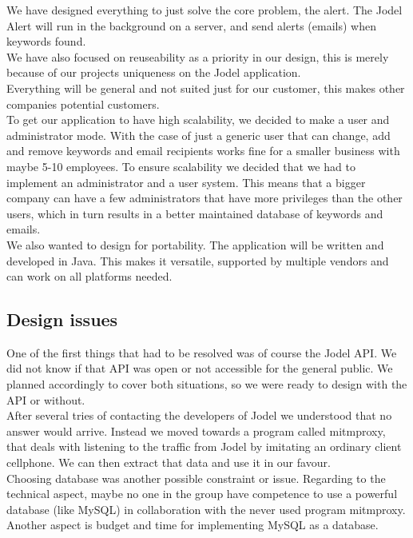 \documentclass[a4paper,12pt]{article}
\begin{document}
We have designed everything to just solve the core problem, the alert. The Jodel Alert will run in the background on a server, and send alerts (emails) when keywords found. \\

We have also focused on reuseability as a priority in our design, this is merely because of our projects uniqueness on the Jodel application. \\

Everything will be general and not suited just for our customer, this makes other companies potential customers.\\

To get our application to have high scalability, we decided to make a user and administrator mode.
With the case of just a generic user that can change, add and remove keywords and email recipients works fine for a smaller business with maybe 5-10 employees.
To ensure scalability we decided that we had to implement an administrator and a user system. This means that a bigger company can have a few administrators that have more privileges than the other users, which in turn results in a better maintained database of keywords and emails.\\

We also wanted to design for portability. The application will be written and developed in Java. This makes it versatile, supported by multiple vendors and can work on all platforms needed.


\subsection{Design issues}
One of the first things that had to be resolved was of course the Jodel API. We did not know if that API was open or not accessible for the general public. We planned accordingly to cover both situations, so we were ready to design with the API or without. \\

After several tries of contacting the developers of Jodel we understood that no answer would arrive. Instead we moved towards a program called mitmproxy, that deals with listening to the traffic from Jodel by imitating an ordinary client cellphone. We can then extract that data and use it in our favour.\\
Choosing database was another possible constraint or issue. Regarding to the technical aspect, maybe no one in the group have competence to use a powerful database (like MySQL) in collaboration with the never used program mitmproxy. Another aspect is budget and time for implementing MySQL as a database.  \\
\end{document}

